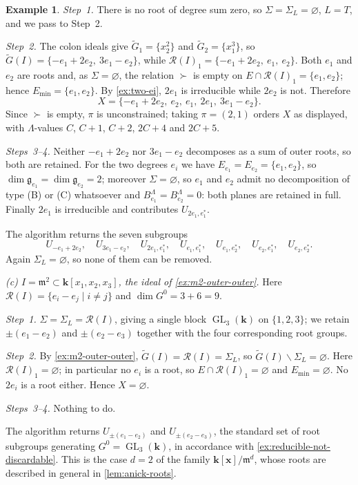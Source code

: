 \documentclass[11pt,letterpaper,reqno]{amsart}
\theoremstyle{remark}
\theoremstyle{definition}
\newtheorem{example}[example]{Example}
\def\M{\mathfrak{m}}
\def\XX{\mathbf{x}}
\newcommand{\KK}[0]{\ensuremath{\mathbf{k}}}
\newcommand{\GL}[0]{\ensuremath{\operatorname{GL}}}
\newcommand{\R}{\mathcal R}
\begin{document}
\begin{example}
\emph{Step~1.} There is no root of degree sum zero, so $\Sigma=\Sigma_L=\varnothing$, $L=T$,
and we pass to Step~2.

\emph{Step~2.} The colon ideals give $\widetilde G_1=\{x_2^2\}$ and $\widetilde G_2=\{x_1^3\}$,
so $\widetilde G(I)=\{-e_1+2e_2,\ 3e_1-e_2\}$, while $\R(I)_1=\{-e_1+2e_2,\ e_1,\ e_2\}$. Both
$e_1$ and $e_2$ are roots and, as $\Sigma=\varnothing$, the relation $\succ$ is empty on
$E\cap\R(I)_1=\{e_1,e_2\}$; hence $E_{\mathrm{min}}=\{e_1,e_2\}$. By \cref{ex:two-ei}, $2e_1$
is irreducible while $2e_2$ is not. Therefore
$$X=\{-e_1+2e_2,\ e_2,\ e_1,\ 2e_1,\ 3e_1-e_2\}.$$
Since $\succ$ is empty, $\pi$ is unconstrained; taking $\pi=(2,1)$ orders $X$ as displayed,
with $\Lambda$-values $C$, $C+1$, $C+2$, $2C+4$ and $2C+5$.

\emph{Steps~3--4.} Neither $-e_1+2e_2$ nor $3e_1-e_2$ decomposes as a sum of outer roots, so
both are retained. For the two degrees $e_i$ we have $E_{e_1}=E_{e_2}=\{e_1,e_2\}$, so
$\dim\mathfrak g_{e_1}=\dim\mathfrak g_{e_2}=2$; moreover $\Sigma=\varnothing$, so $e_1$ and
$e_2$ admit no decomposition of type \textup{(B)} or \textup{(C)} whatsoever and
$B^\Lambda_{e_1}=B^\Lambda_{e_2}=0$: both planes are retained in full. Finally $2e_1$ is
irreducible and contributes $U_{2e_1,e_1^*}$.

The algorithm returns the seven subgroups
$$U_{-e_1+2e_2},\quad U_{3e_1-e_2},\quad U_{2e_1,e_1^*},\quad
U_{e_1,e_1^*},\quad U_{e_1,e_2^*},\quad U_{e_2,e_1^*},\quad U_{e_2,e_2^*}.$$
Again $\Sigma_L=\varnothing$, so none of them can be removed.

\medskip\noindent\emph{(c) $I=\M^2\subset\KK[x_1,x_2,x_3]$, the ideal of
\cref{ex:m2-outer-outer}.} Here $\R(I)=\{e_i-e_j\mid i\neq j\}$ and $\dim G^0=3+6=9$.

\emph{Step~1.} $\Sigma=\Sigma_L=\R(I)$, giving a single block $\GL_3(\KK)$ on
$\{1,2,3\}$; we retain $\pm(e_1-e_2)$ and $\pm(e_2-e_3)$ together with the four
corresponding root groups.

\emph{Step~2.} By \cref{ex:m2-outer-outer}, $\widetilde G(I)=\R(I)=\Sigma_L$, so
$\widetilde G(I)\smallsetminus\Sigma_L=\varnothing$. Here $\R(I)_1=\varnothing$; in
particular no $e_i$ is a root, so $E\cap\R(I)_1=\varnothing$ and
$E_{\mathrm{min}}=\varnothing$. No $2e_i$ is a root either. Hence $X=\varnothing$.

\emph{Steps~3--4.} Nothing to do.

The algorithm returns $U_{\pm(e_1-e_2)}$ and $U_{\pm(e_2-e_3)}$, the standard set of root
subgroups generating $G^0=\GL_3(\KK)$, in accordance with
\cref{ex:reducible-not-discardable}. This is the case $d=2$ of the family
$\KK[\XX]/\M^d$, whose roots are described in general in \cref{lem:anick-roots}.


\end{example}
\end{document}
